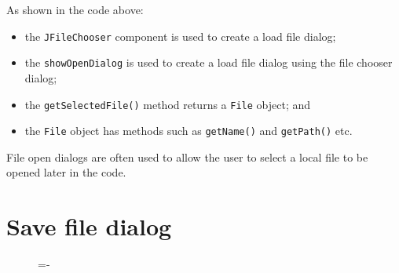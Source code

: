 \documentclass[a4paper]{systems-software}
\begin{document}
As shown in the code above:
\begin{itemize}
	\item the \texttt{JFileChooser} component is used to create a load file dialog;
	\item the \texttt{showOpenDialog} is used to create a load file dialog using the file chooser dialog;
	\item the \texttt{getSelectedFile()} method returns a \texttt{File} object; and
	\item the \texttt{File} object has methods such as \texttt{getName()} and \texttt{getPath()} etc.
\end{itemize}

File open dialogs are often used to allow the user to select a local file to be opened later in the code.


\section*{Save file dialog}

\begin{figure}[H]
	\lineskip=-\fboxrule
\end{figure}
\end{document}

